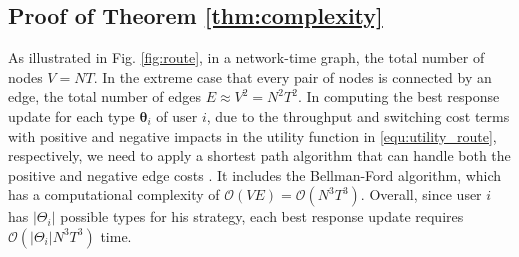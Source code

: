 \documentclass[journal]{IEEEtran}
\newcommand{\mc}[1]{\mathcal{#1}}
\newcommand{\bs}[1]{\boldsymbol{#1}}
\begin{document}
\subsection{Proof of Theorem \ref{thm:complexity}} \label{app:complexity}

  As illustrated in Fig. \ref{fig:route}, in a network-time graph, the total number of nodes $V = NT$. In the extreme case that every pair of nodes is connected by an edge, the total number of edges $E \approx V^2 = N^2 T^2$.
	In computing the best response update for each type $\bs{\theta}_i$ of user $i$, due to the throughput and switching cost terms with positive and negative impacts in the utility function in \eqref{equ:utility_route}, respectively, we need to apply a shortest path algorithm that can handle both the positive and negative edge costs \cite{weiss_ds97}. It includes the Bellman-Ford algorithm, which has a computational complexity of $\mc{O}(VE) = \mc{O}(N^3 T^3)$. 
	Overall, since user $i$ has $|\Theta_i|$ possible types for his strategy, each best response update requires $\mc{O}(|\Theta_i| N^3 T^3)$ time. \hfill \IEEEQED %




%






\end{document}
